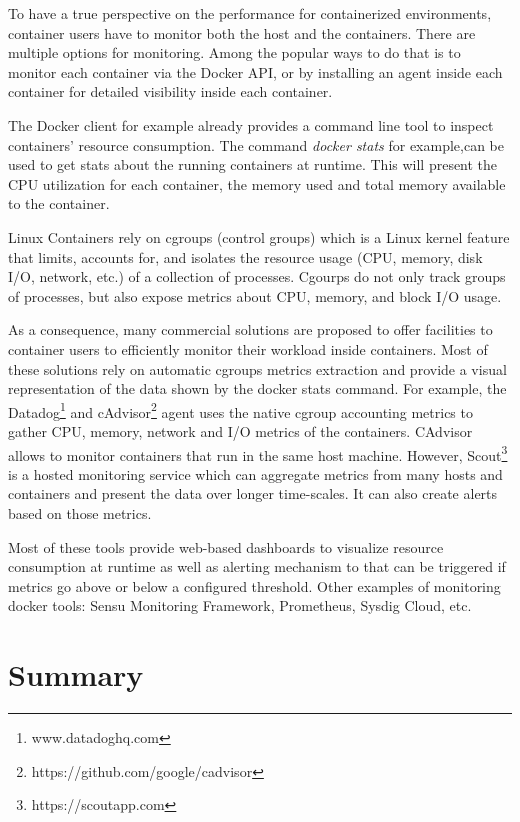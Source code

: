 To have a true perspective on the performance for containerized environments, container users have to monitor both the host and the containers. There are multiple options for monitoring. 
Among the popular ways to do that is to monitor each container via the Docker API, or by installing an agent inside each container for detailed visibility inside each container. 

The Docker client for example already provides a command line tool to inspect containers’ resource consumption. The command \textit{docker stats} for example,can be used to get stats about the running containers at runtime. This will present the CPU utilization for each container, the memory used and total memory available to the container.

Linux Containers rely on cgroups (control groups) which is a Linux kernel feature that limits, accounts for, and isolates the resource usage (CPU, memory, disk I/O, network, etc.) of a collection of processes.
Cgourps do not only track groups of processes, but also expose metrics about CPU, memory, and block I/O usage. 

As a consequence, many commercial solutions are proposed to  offer facilities to container users to efficiently monitor their workload inside containers. Most of these solutions rely on automatic cgroups metrics extraction and provide a visual representation of the data shown by the docker stats command. For example, the Datadog\footnote{www.datadoghq.com} and cAdvisor\footnote{https://github.com/google/cadvisor} agent uses the native cgroup accounting metrics to gather CPU, memory, network and I/O metrics of the containers. CAdvisor allows to monitor containers that run in the same host machine. However, Scout\footnote{https://scoutapp.com} is a hosted monitoring service which can aggregate metrics from many hosts and containers and present the data over longer time-scales. It can also create alerts based on those metrics. 

Most of these tools provide web-based dashboards to visualize resource consumption at runtime as well as alerting mechanism to that can be triggered if metrics go above or below a configured threshold. Other examples of monitoring docker tools: Sensu Monitoring Framework, Prometheus, Sysdig Cloud, etc.




\section{Summary}
 



